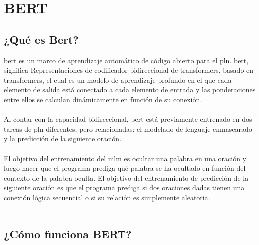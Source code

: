 \documentclass[12pt, a4paper, titlepage]{report}
\begin{document}
        \section{BERT}
		        \subsection{¿Qué es Bert?}
		        \acrfull{bert} es un marco de aprendizaje automático de código abierto para el \acrfull{pln}. \acrshort{bert}, significa Representaciones de codificador bidireccional de transformers, basado en transformers, el cual es un modelo de aprendizaje profundo en el que cada elemento de salida está conectado a cada elemento de entrada y las ponderaciones entre ellos se calculan dinámicamente en función de su conexión. \cite{refQueesBert} \\\\        
		        Al contar con  la capacidad bidireccional, \acrshort{bert} está previamente entrenado en dos tareas de \acrshort{pln} diferentes, pero relacionadas: el modelado de lenguaje enmascarado y la predicción de la siguiente oración.\\\\        
		        El objetivo del entrenamiento del \acrfull{mlm} es ocultar una palabra en una oración y luego hacer que el programa prediga qué palabra se ha ocultado en función del contexto de la palabra oculta. El objetivo del entrenamiento de predicción de la siguiente oración es que el programa prediga si dos oraciones dadas tienen una conexión lógica secuencial o si su relación es simplemente aleatoria.\\\\
		        
		        \subsection{¿Cómo funciona BERT?}
		        
\end{document}
